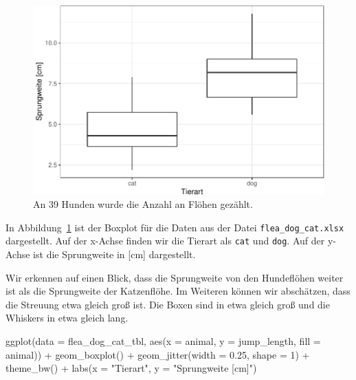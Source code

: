 \documentclass[
  letterpaper,
]{scrbook}
\newenvironment{Shaded}{\begin{snugshade}}{\end{snugshade}}
\newcommand{\AttributeTok}[1]{\textcolor[rgb]{0.40,0.45,0.13}{#1}}
\newcommand{\DecValTok}[1]{\textcolor[rgb]{0.68,0.00,0.00}{#1}}
\newcommand{\FloatTok}[1]{\textcolor[rgb]{0.68,0.00,0.00}{#1}}
\newcommand{\FunctionTok}[1]{\textcolor[rgb]{0.28,0.35,0.67}{#1}}
\newcommand{\NormalTok}[1]{\textcolor[rgb]{0.00,0.23,0.31}{#1}}
\newcommand{\SpecialCharTok}[1]{\textcolor[rgb]{0.37,0.37,0.37}{#1}}
\newcommand{\StringTok}[1]{\textcolor[rgb]{0.13,0.47,0.30}{#1}}
\begin{document}
\begin{figure}

{\centering \includegraphics{./eda-ggplot_files/figure-pdf/fig-boxplot-flea-0-1.pdf}

}

\caption{\label{fig-boxplot-flea-0}An 39 Hunden wurde die Anzahl an
Flöhen gezählt.}

\end{figure}

In Abbildung~\ref{fig-boxplot-flea-0} ist der Boxplot für die Daten aus
der Datei \texttt{flea\_dog\_cat.xlsx} dargestellt. Auf der x-Achse
finden wir die Tierart als \texttt{cat} und \texttt{dog}. Auf der
y-Achse ist die Sprungweite in {[}cm{]} dargestellt.

Wir erkennen auf einen Blick, dass die Sprungweite von den Hundeflöhen
weiter ist als die Sprungweite der Katzenflöhe. Im Weiteren können wir
abschätzen, dass die Streuung etwa gleich groß ist. Die Boxen sind in
etwa gleich groß und die Whiskers in etwa gleich lang.

\begin{Shaded}
\begin{Highlighting}[]
\FunctionTok{ggplot}\NormalTok{(}\AttributeTok{data =}\NormalTok{ flea\_dog\_cat\_tbl, }\FunctionTok{aes}\NormalTok{(}\AttributeTok{x =}\NormalTok{ animal, }\AttributeTok{y =}\NormalTok{ jump\_length,}
                                    \AttributeTok{fill =}\NormalTok{ animal)) }\SpecialCharTok{+}
  \FunctionTok{geom\_boxplot}\NormalTok{() }\SpecialCharTok{+}
  \FunctionTok{geom\_jitter}\NormalTok{(}\AttributeTok{width =} \FloatTok{0.25}\NormalTok{, }\AttributeTok{shape =} \DecValTok{1}\NormalTok{) }\SpecialCharTok{+}
  \FunctionTok{theme\_bw}\NormalTok{() }\SpecialCharTok{+}
  \FunctionTok{labs}\NormalTok{(}\AttributeTok{x =} \StringTok{"Tierart"}\NormalTok{, }\AttributeTok{y =} \StringTok{"Sprungweite [cm]"}\NormalTok{) }
\end{Highlighting}
\end{Shaded}
\end{document}
